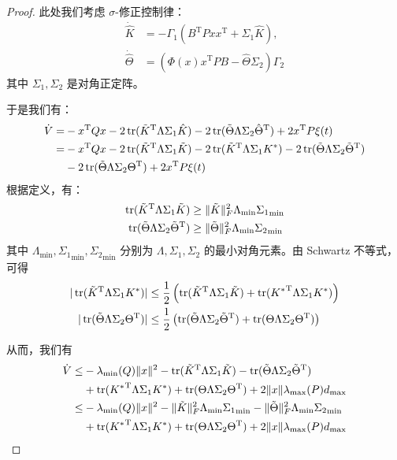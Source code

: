\begin{proof}
    此处我们考虑 $\sigma$-修正控制律：
    \begin{align*}
        \dot{\hat{K}}&=-\Gamma_1(B^\mathrm{T}Pxx^\mathrm{T}+\Sigma_1\hat{K}), \\ \dot{\hat{\Theta}}&=(\Phi(x)x^\mathrm{T}PB-\hat{\Theta}\Sigma_2)\Gamma_2
    \end{align*}
    其中 $\Sigma_1, \Sigma_2$ 是对角正定阵。

    于是我们有：
    \begin{align*}
        \dot{V}=&-x^\mathrm{T}Qx-2\operatorname{tr}(\tilde{K}^\mathrm{T}\Lambda\Sigma_1\hat{K})-2\operatorname{tr}(\tilde{\Theta}\Lambda\Sigma_2\hat{\Theta}^\mathrm{T})+2x^\mathrm{T}P\xi(t)\\
        =&-x^\mathrm{T}Qx-2\operatorname{tr}(\tilde{K}^\mathrm{T}\Lambda\Sigma_1\tilde{K})-2\operatorname{tr}(\tilde{K}^\mathrm{T}\Lambda\Sigma_1 K^*)-2\operatorname{tr}(\tilde{\Theta}\Lambda\Sigma_2\tilde{\Theta}^\mathrm{T})\\
        &-2\operatorname{tr}(\tilde{\Theta}\Lambda\Sigma_2\Theta^\mathrm{T})+2x^\mathrm{T}P\xi(t)
    \end{align*}
    根据定义，有：
    \begin{align*}
        \operatorname{tr}(\tilde{K}^\mathrm{T}\Lambda\Sigma_1\tilde{K})&\geq \|\tilde{K}\|_F^2\Lambda_{\mathrm{min}}{\Sigma_1}_{\mathrm{min}} \\
        \operatorname{tr}(\tilde{\Theta}\Lambda\Sigma_2\tilde{\Theta}^\mathrm{T})&\geq \|\tilde{\Theta}\|_F^2\Lambda_{\mathrm{min}}{\Sigma_2}_{\mathrm{min}}
    \end{align*}
    其中 $\Lambda_{\mathrm{min}}, {\Sigma_1}_{\mathrm{min}}, {\Sigma_2}_{\mathrm{min}}$ 分别为 $\Lambda, \Sigma_1, \Sigma_2$ 的最小对角元素。由 Schwartz 不等式，可得
    \begin{align*}
        |\operatorname{tr}(\tilde{K}^\mathrm{T}\Lambda\Sigma_1 K^*)| &\leq \dfrac{1}{2} \left( \operatorname{tr}(\tilde{K}^\mathrm{T} \Lambda\Sigma_1 \tilde{K}) + \operatorname{tr}({K^*}^\mathrm{T} \Lambda\Sigma_1 K^*) \right) \\
        |\operatorname{tr}(\tilde{\Theta}\Lambda\Sigma_2 \Theta^\mathrm{T})| &\leq \dfrac{1}{2} \left( \operatorname{tr}(\tilde{\Theta} \Lambda\Sigma_2 \tilde{\Theta}^\mathrm{T}) + \operatorname{tr}(\Theta \Lambda\Sigma_2 \Theta^\mathrm{T}) \right)
    \end{align*}

    从而，我们有
    \begin{align*}
        \dot{V} \leq & -\lambda_{\min}(Q)\|x\|^2
        -\operatorname{tr}(\tilde{K}^\mathrm{T}\Lambda\Sigma_1\tilde{K})
        -\operatorname{tr}(\tilde{\Theta}\Lambda\Sigma_2\tilde{\Theta}^\mathrm{T})\\
        &+\operatorname{tr}({K^*}^\mathrm{T} \Lambda\Sigma_1 K^*)+\operatorname{tr}(\Theta \Lambda\Sigma_2 \Theta^\mathrm{T})+2\|x\|\lambda_{\max}(P)d_{\mathrm{max}}\\
        \leq & -\lambda_{\min}(Q)\|x\|^2 - \|\tilde{K}\|_F^2\Lambda_{\mathrm{min}}{\Sigma_1}_{\mathrm{min}} - \|\tilde{\Theta}\|_F^2\Lambda_{\mathrm{min}}{\Sigma_2}_{\mathrm{min}} \\
        &+\operatorname{tr}({K^*}^\mathrm{T} \Lambda\Sigma_1 K^*)+\operatorname{tr}(\Theta \Lambda\Sigma_2 \Theta^\mathrm{T})+2\|x\|\lambda_{\max}(P)d_{\mathrm{max}}
    \end{align*}


\end{proof}
